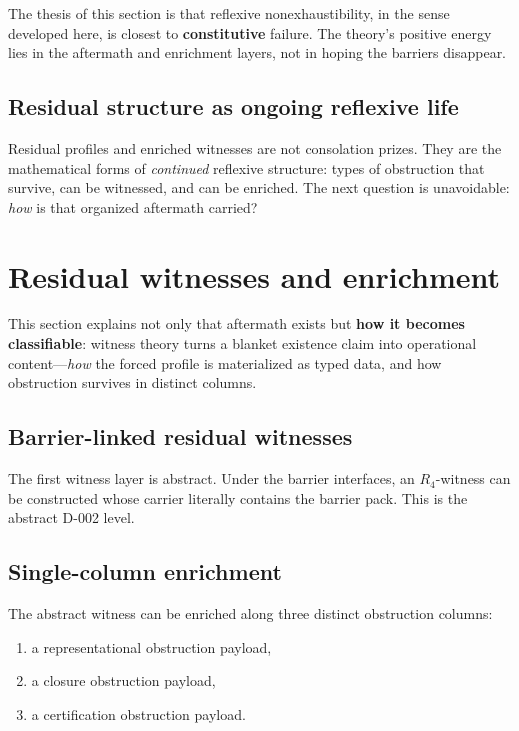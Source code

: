 \documentclass[11pt]{article}
\theoremstyle{plain}
\theoremstyle{definition}
\theoremstyle{remark}
\begin{document}
The thesis of this section is that reflexive nonexhaustibility, in the sense developed here, is closest to \textbf{constitutive} failure. The theory's positive energy lies in the aftermath and enrichment layers, not in hoping the barriers disappear.

\subsection{Residual structure as ongoing reflexive life}

Residual profiles and enriched witnesses are not consolation prizes. They are the mathematical forms of \emph{continued} reflexive structure: types of obstruction that survive, can be witnessed, and can be enriched. The next question is unavoidable: \emph{how} is that organized aftermath carried?

\section{Residual witnesses and enrichment}

This section explains not only that aftermath exists but \textbf{how it becomes classifiable}: witness theory turns a blanket existence claim into operational content---\emph{how} the forced profile is materialized as typed data, and how obstruction survives in distinct columns.

\subsection{Barrier-linked residual witnesses}

The first witness layer is abstract. Under the barrier interfaces, an \(R_4\)-witness can be constructed whose carrier literally contains the barrier pack. This is the abstract D-002 level.

\subsection{Single-column enrichment}

The abstract witness can be enriched along three distinct obstruction columns:
\begin{enumerate}[label=(\arabic*)]
\item a representational obstruction payload,
\item a closure obstruction payload,
\item a certification obstruction payload.
\end{enumerate}
\end{document}
